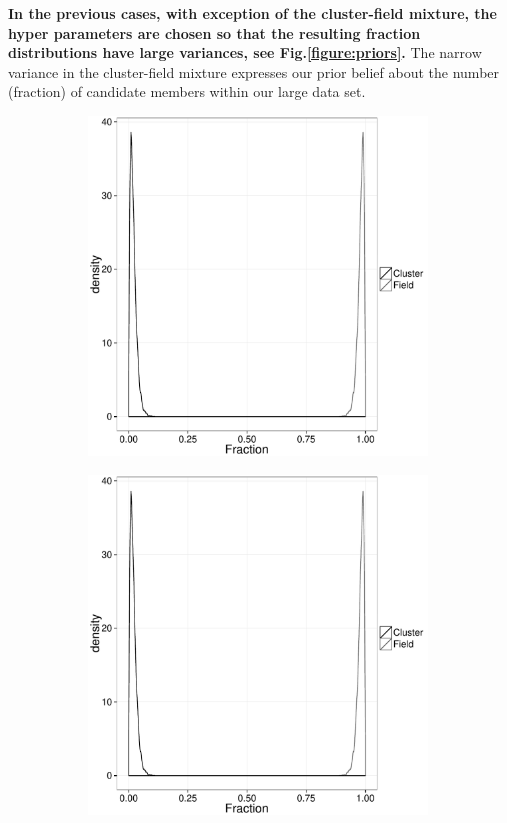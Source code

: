 \textbf{In the previous cases, with exception of the cluster-field mixture, the hyper parameters are chosen so that the resulting fraction distributions have large variances, see Fig.\ref{figure:priors}.} The narrow variance in the cluster-field mixture expresses our prior belief about the number (fraction) of candidate members within our large data set.

\begin{figure}[ht!]
    \centering
    \begin{subfigure}[t]{0.48\textwidth}
        \includegraphics[page=1,height=9cm,width=\textwidth]{background/Figures/Priors.pdf}
        \caption{}
        \label{}
    \end{subfigure}
    \begin{subfigure}[t]{0.48\textwidth}
      \includegraphics[page=2,height=9cm,width=\textwidth]{background/Figures/Priors.pdf}

\end{subfigure}
\end{figure}
